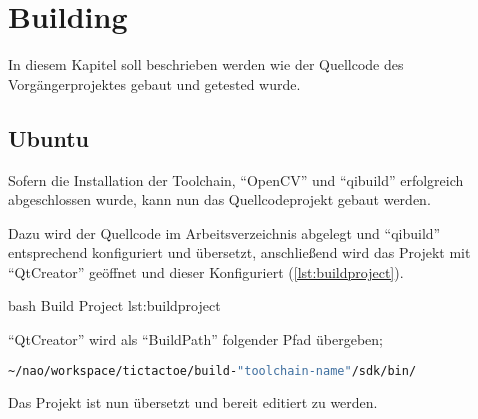 \chapter{Building}

    In diesem Kapitel soll beschrieben werden wie der Quellcode des
    Vorgängerprojektes gebaut und getested wurde.

    \section{Ubuntu}

        Sofern die Installation der Toolchain, ``OpenCV'' und ``qibuild''
        erfolgreich abgeschlossen wurde, kann nun das Quellcodeprojekt gebaut
        werden.

        Dazu wird der Quellcode im Arbeitsverzeichnis abgelegt und ``qibuild''
        entsprechend konfiguriert und übersetzt,
        anschließend wird das Projekt mit ``QtCreator'' geöffnet und dieser
        Konfiguriert (\ref{lst:buildproject}).

                    {bash}
                    {Build Project}
                    {lst:buildproject}

        ``QtCreator'' wird als ``BuildPath'' folgender Pfad übergeben;

\begin{lstlisting}[caption={QtCreator build path},label=lst:qtcbp,language=bash]
~/nao/workspace/tictactoe/build-"toolchain-name"/sdk/bin/
\end{lstlisting}

        Das Projekt ist nun übersetzt und bereit editiert zu werden.

